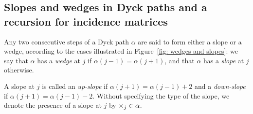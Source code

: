 \documentclass[oneside,english]{amsart}
\numberwithin{equation}{section}
\numberwithin{figure}{section}
\theoremstyle{plain}
\theoremstyle{plain}
\theoremstyle{plain}
\theoremstyle{remark}
\theoremstyle{plain}
\theoremstyle{plain}
\theoremstyle{plain}
\theoremstyle{plain}
\theoremstyle{plain}
\theoremstyle{plain}
\theoremstyle{plain}
\theoremstyle{plain}
\newcommand{\alexmod}[1]{{\color{allucol} #1}}
\newcommand{\blue}[1]{{\color{blue} #1}}
\begin{document}
\subsection{Slopes and wedges in Dyck paths and a recursion for incidence matrices}

Any two consecutive steps of a Dyck path $\alpha$ are said to form either a slope or a wedge,
according to the cases illustrated in Figure~\ref{fig: wedges and slopes}:
we say that $\alpha$ has a \emph{wedge} at $j$ if $\alpha(j-1) = \alpha(j+1)$,
and that $\alpha$ has a \emph{slope} at $j$ otherwise.

A slope at $j$ %
is called an \emph{up-slope} if $\alpha(j+1) = \alpha(j-1)+2$
and a \emph{down-slope} if $\alpha(j+1) = \alpha(j-1)-2$.
Without specifying the type of the slope, we denote
the presence of a slope at $j$ %
by $\times_j \in \alpha$.

\end{document}
